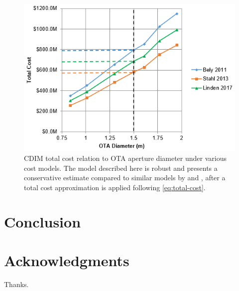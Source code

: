 \documentclass{ws-jai}
\begin{document}
\begin{figure}
  \centering
  \includegraphics[width=.6\linewidth]{figs/total-cost-vs-diameter.png}
  \caption{CDIM total cost relation to OTA aperture diameter under various cost models. The model described here is robust and presents a conservative estimate compared to similar models by \citeauthor{bely2011} and \citeauthor{stahl2013}, after a total cost approximation is applied following \autoref{eq:total-cost}.
\label{fig:cost-total-compare-models}
}
\end{figure}

\section{Conclusion}
\label{sec:conclusion}
\section*{Acknowledgments}
Thanks.


\end{document}
